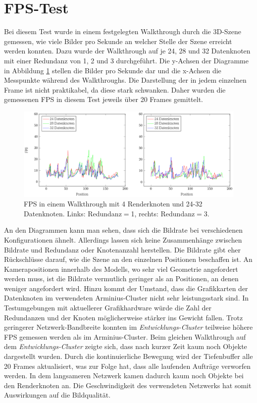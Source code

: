 \section{FPS-Test}
\label{sec:eval:fps}
Bei diesem Test wurde in einem festgelegten Walkthrough durch die 3D-Szene gemessen, wie viele Bilder pro Sekunde an welcher Stelle der Szene erreicht werden konnten. Dazu wurde der Walkthrough auf je 24, 28 und 32 Datenknoten mit einer Redundanz von 1, 2 und 3 durchgeführt. Die y-Achsen der Diagramme in Abbildung \ref{fig:eval:fps} stellen die Bilder pro Sekunde dar und die x-Achsen die Messpunkte während des Walkthroughs. Die Darstellung der in jedem einzelnen Frame ist nicht praktikabel, da diese stark schwanken. Daher wurden die gemessenen FPS in diesem Test jeweils über 20 Frames gemittelt.
\begin{figure}
\centering
\includegraphics[scale=0.75]{images/diag_fps.pdf}
  \caption{\label{fig:eval:fps}FPS in einem Walkthrough mit 4 Renderknoten und 24-32 Datenknoten. Links: Redundanz$=$1, rechts: Redundanz$=$3.}
\end{figure}

An den Diagrammen kann man sehen, dass sich die Bildrate bei verschiedenen Konfigurationen ähnelt. Allerdings lassen sich keine Zusammenhänge zwischen Bildrate und Redundanz oder Knotenanzahl herstellen. Die Bildrate gibt eher Rückschlüsse darauf, wie die Szene an den einzelnen Positionen beschaffen ist. An Kamerapositionen innerhalb des Modells, wo sehr viel Geometrie angefordert werden muss, ist die Bildrate vermutlich geringer als an Positionen, an denen weniger angefordert wird. Hinzu kommt der Umstand, dass die Grafikkarten der Datenknoten im verwendeten Arminius-Cluster nicht sehr leistungsstark sind. In Testumgebungen mit aktuellerer Grafikhardware würde die Zahl der Redundanzen und der Knoten möglicherweise stärker ins Gewicht fallen. Trotz geringerer Netzwerk-Bandbreite konnten im \textit{Entwicklungs-Cluster} teilweise höhere FPS gemessen werden als im Arminius-Cluster. Beim gleichen Walkthrough auf dem \textit{Entwicklungs-Cluster} zeigte sich, dass nach kurzer Zeit kaum noch Objekte dargestellt wurden. Durch die kontinuierliche Bewegung wird der Tiefenbuffer alle 20 Frames aktualisiert, was zur Folge hat, dass alle laufenden Aufträge verworfen werden. In dem langsameren Netzwerk kamen dadurch kaum noch Objekte bei den Renderknoten an. Die Geschwindigkeit des verwendeten Netzwerks hat somit Auswirkungen auf die Bildqualität.


